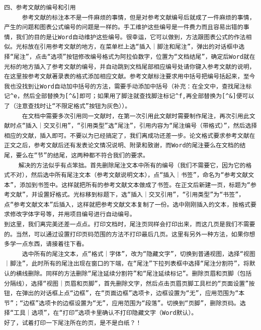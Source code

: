 \begin{verbatim}
四、参考文献的编号和引用 
     参考文献的标注本不是一件麻烦的事情，但是对参考文献编号后就成了一件麻烦的事情，产生的问题和图表公式编号的问题是一样的。手工维护这些编号是一件费力而且容易出错的事情，我们的目的是让Word自动维护这些编号。很幸运，它可以做到，方法跟图表公式的作法相似。光标放在引用参考文献的地方，在菜单栏上选“插入｜脚注和尾注”，弹出的对话框中选择“尾注”，点击“选项”按钮修改编号格式为阿拉伯数字，位置为“文档结尾”，确定后Word就在光标的地方插入了参考文献的编号，并自动跳到文档尾部相应编号处请你键入参考文献的说明，在这里按参考文献著录表的格式添加相应文献。参考文献标注要求用中括号把编号括起来，至今我也没找到让Word自动加中括号的方法，需要手动添加中括号（补充：在全文中，查找尾注标记^e，然后全部替换为[^&]即可；如果用了脚注就查找脚注标记^f,再全部替换为[^&]便可以了（注意查找时让“不限定格式”按钮为灰色））。 
     在文档中需要多次引用同一文献时，在第一次引用此文献时需要制作尾注，再次引用此文献时点“插入｜交叉引用”，“引用类型”选“尾注”，引用内容为“尾注编号（带格式）”，然后选择相应的文献，插入即可。不要以为已经搞定了，我们离成功还差一步。论文格式要求参考文献在正文之后，参考文献后还有发表论文情况说明、附录和致谢，而Word的尾注要么在文档的结尾，要么在“节”的结尾，这两种都不符合我们的要求。 
    解决的方法似乎有点笨拙。首先删除尾注文本中所有的编号（我们不需要它，因为它的格式不对），然后选中所有尾注文本（参考文献说明文本），点“插入｜书签”，命名为“参考文献文本”，添加到书签中。这样就把所有的参考文献文本做成了书签。在正文后新建一页，标题为“参考文献”，并设置好格式。光标移到标题下，选“插入｜交叉引用”，“引用类型”为“书签”，点“参考文献文本”后插入，这样就把参考文献文本复制了一份。选中刚刚插入的文本，按格式要求修改字体字号等，并用项目编号进行自动编号。
到这里，我们离完美还差一点点。打印文档时，尾注页同样会打印出来，而这几页是我们不需要的。当然，可以通过设置打印页码范围的方法不打印最后几页。这里有另外一种方法，如果你想多学一点东西，请接着往下看。 
     选中所有的尾注文本，点“格式｜字体”，改为“隐藏文字”，切换到普通视图，选择“视图｜脚注”，此时所有的尾注出现在窗口的下端，在“尾注”下拉列表框中选择“尾注分割符”，将默认的横线删除。同样的方法删除“尾注延续分割符”和“尾注延续标记”。删除页眉和页脚（包括分隔线），选择“视图｜页眉和页脚”，首先删除文字，然后点击页眉页脚工具栏的“页面设置”按钮，在弹出的对话框上点“边框”，在“页面边框”选项卡，边框设置为“无”，应用范围为“本节”；“边框”选项卡的边框设置为“无”，应用范围为“段落”。切换到“页脚”，删除页码。选择“工具｜选项”，在“打印”选项卡里确认不打印隐藏文字（Word默认）。 
好了，试着打印一下尾注所在的页，是不是白纸？！
 

\end{verbatim}
